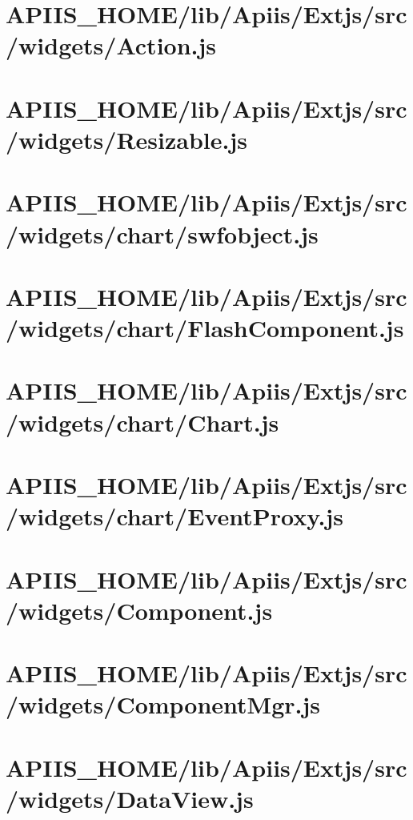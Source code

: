 \section{APIIS\_HOME/lib/Apiis/Extjs/src/widgets/Action.js} 
\section{APIIS\_HOME/lib/Apiis/Extjs/src/widgets/Resizable.js} 
\section{APIIS\_HOME/lib/Apiis/Extjs/src/widgets/chart/swfobject.js} 
\section{APIIS\_HOME/lib/Apiis/Extjs/src/widgets/chart/FlashComponent.js} 
\section{APIIS\_HOME/lib/Apiis/Extjs/src/widgets/chart/Chart.js} 
\section{APIIS\_HOME/lib/Apiis/Extjs/src/widgets/chart/EventProxy.js} 
\section{APIIS\_HOME/lib/Apiis/Extjs/src/widgets/Component.js} 
\section{APIIS\_HOME/lib/Apiis/Extjs/src/widgets/ComponentMgr.js} 
\section{APIIS\_HOME/lib/Apiis/Extjs/src/widgets/DataView.js} 
